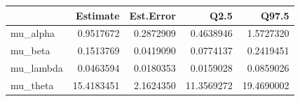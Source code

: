 
\begin{tabular}{lrrrr}
\toprule
  & Estimate & Est.Error & Q2.5 & Q97.5\\
\midrule
mu\_alpha & 0.9517672 & 0.2872909 & 0.4638946 & 1.5727320\\
mu\_beta & 0.1513769 & 0.0419090 & 0.0774137 & 0.2419451\\
mu\_lambda & 0.0463594 & 0.0180353 & 0.0159028 & 0.0859026\\
mu\_theta & 15.4183451 & 2.1624350 & 11.3569272 & 19.4690002\\
\bottomrule
\end{tabular}
